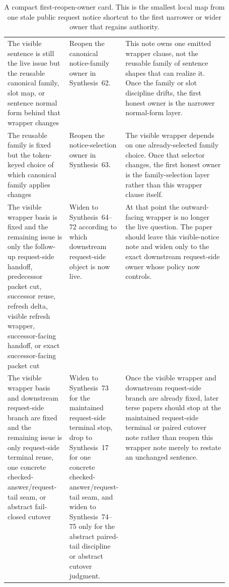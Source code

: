 \documentclass[11pt]{article}
\begin{document}
\begin{table}[t]
\begin{tabularx}{\linewidth}{@{}p{0.29\linewidth}p{0.22\linewidth}X@{}}
The visible sentence is still the live issue but the reusable canonical family, slot map, or sentence normal form behind that wrapper changes & Reopen the canonical notice-family owner in Synthesis~62. & This note owns one emitted wrapper clause, not the reusable family of sentence shapes that can realize it. Once the family or slot discipline drifts, the first honest owner is the narrower normal-form layer. \\
The reusable family is fixed but the token-keyed choice of which canonical family applies changes & Reopen the notice-selection owner in Synthesis~63. & The visible wrapper depends on one already-selected family choice. Once that selector changes, the first honest owner is the family-selection layer rather than this wrapper clause itself. \\
The visible wrapper basis is fixed and the remaining issue is only the follow-up request-side handoff, predecessor packet cut, successor reuse, refresh delta, visible refresh wrapper, successor-facing handoff, or exact successor-facing packet cut & Widen to Synthesis~64--72 according to which downstream request-side object is now live. & At that point the outward-facing wrapper is no longer the live question. The paper should leave this visible-notice note and widen only to the exact downstream request-side owner whose policy now controls. \\
The visible wrapper basis and downstream request-side branch are fixed and the remaining issue is only request-side terminal reuse, one concrete checked-answer/request-tail seam, or abstract fail-closed cutover & Widen to Synthesis~73 for the maintained request-side terminal stop, drop to Synthesis~17 for one concrete checked-answer/request-tail seam, and widen to Synthesis~74--75 only for the abstract paired-tail discipline or abstract cutover judgment. & Once the visible wrapper and downstream request-side branch are already fixed, later terse papers should stop at the maintained request-side terminal or paired cutover note rather than reopen this wrapper note merely to restate an unchanged sentence. \\
\bottomrule
\end{tabularx}
\caption{A compact first-reopen-owner card. This is the smallest local map from one stale public request notice shortcut to the first narrower or wider owner that regains authority.}
\label{tab:first-reopen-owner-card-public-request-notices}
\end{table}
\end{document}

